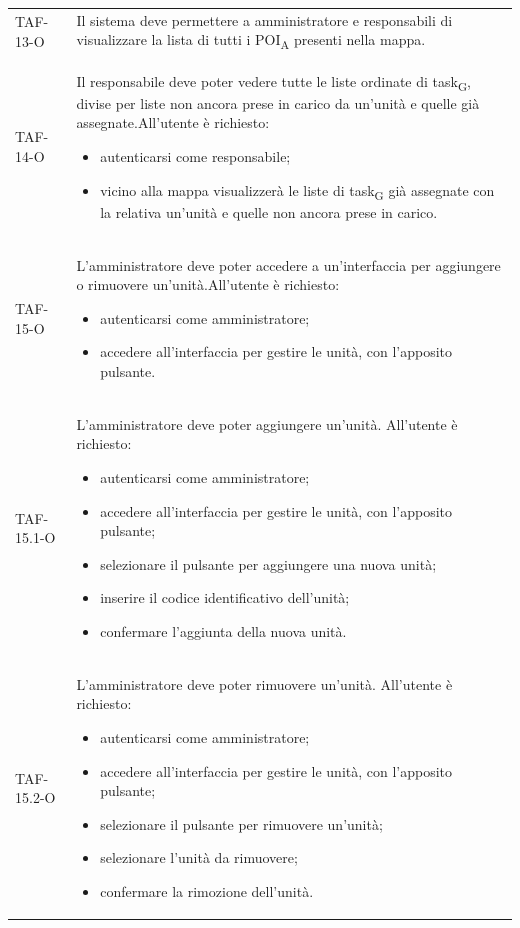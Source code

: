 \begin{longtable}{ >{\centering}p{} >{}p{}}
	TAF-13-O & Il sistema deve permettere a amministratore e responsabili di visualizzare la lista di tutti i POI\textsubscript{A} presenti nella mappa.\tabularnewline

	TAF-14-O & Il responsabile deve poter vedere tutte le liste ordinate di task\textsubscript{G}, divise per liste non ancora prese in carico da un'unità e quelle già assegnate.\newline All'utente è richiesto:\begin{itemize} \item autenticarsi come responsabile; \item vicino alla mappa visualizzerà le liste di task\textsubscript{G} già assegnate con la relativa un'unità e quelle non ancora prese in carico. \end{itemize}\tabularnewline

	TAF-15-O & L'amministratore deve poter accedere a un'interfaccia per aggiungere o rimuovere un'unità.\newline All'utente è richiesto: \begin{itemize} \item autenticarsi come amministratore; \item accedere all'interfaccia per gestire le unità, con l'apposito pulsante.\end{itemize}\tabularnewline
	TAF-15.1-O & L'amministratore deve poter aggiungere un'unità. \newline All'utente è richiesto: \begin{itemize} \item autenticarsi come amministratore; \item accedere all'interfaccia per gestire le unità, con l'apposito pulsante; \item selezionare il pulsante per aggiungere una nuova unità; \item inserire il codice identificativo dell'unità; \item confermare l'aggiunta della nuova unità.\end{itemize}\tabularnewline
	
	TAF-15.2-O & L'amministratore deve poter rimuovere un'unità. \newline All'utente è richiesto: \begin{itemize} \item autenticarsi come amministratore; \item accedere all'interfaccia per gestire le unità, con l'apposito pulsante; \item selezionare il pulsante per rimuovere un'unità; \item selezionare l'unità da rimuovere; \item confermare la rimozione dell'unità.\end{itemize}\tabularnewline
	

\end{longtable}
